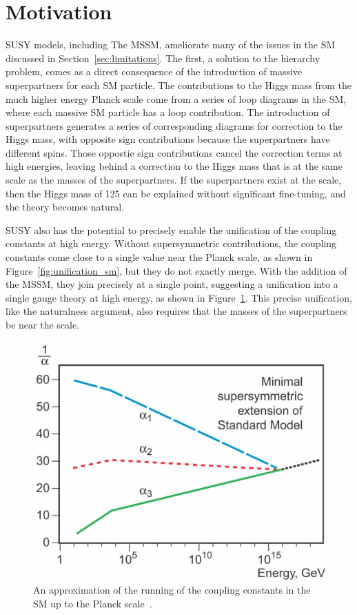 \section{Motivation}

\ac{SUSY} models, including The \ac{MSSM}, ameliorate many of the issues in the \ac{SM} discussed in Section~\ref{sec:limitations}.
The first, a solution to the hierarchy problem, comes as a direct consequence of the introduction of massive superpartners for each \ac{SM} particle.
The contributions to the Higgs mass from the much higher energy Planck scale come from a series of loop diagrams in the \ac{SM}, where each massive \ac{SM} particle has a loop contribution.
The introduction of superpartners generates a series of corresponding diagrams for correction to the Higgs mass, with opposite sign contributions because the superpartners have different spins.
Those oppostie sign contributions cancel the correction terms at high energies, leaving behind a correction to the Higgs mass that is at the same scale as the masses of the superpartners. 
If the superpartners exist at the \TeV scale, then the Higgs mass of 125 \GeV can be explained without significant fine-tuning, and the theory becomes natural.

\ac{SUSY} also has the potential to precisely enable the unification of the coupling constants at high energy.
Without supersymmetric contributions, the coupling constants come close to a single value near the Planck scale, as shown in Figure~\ref{fig:unification_sm}, but they do not exactly merge.
With the addition of the \ac{MSSM}, they join precisely at a single point, suggesting a unification into a single gauge theory at high energy, as shown in Figure~\ref{fig:unification_susy}. 
This precise unification, like the naturalness argument, also requires that the masses of the superpartners be near the \TeV scale.

\begin{figure}
\includegraphics[width=\fullfig]{figures/unification_susy.jpg}
\caption{An approximation of the running of the coupling constants in the \ac{SM} up to the Planck scale~\cite{unification_plot}.}
\label{fig:unification_susy}
\end{figure}

